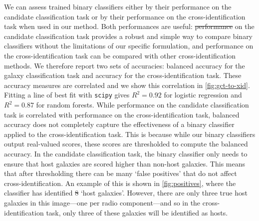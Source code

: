 \documentclass[11pt, a4paper]{book}
\providecommand{\DIFaddtex}[1]{{\protect\color{blue}\uwave{#1}}} %
\providecommand{\DIFdeltex}[1]{{\protect\color{red}\sout{#1}}}                      %
\providecommand{\DIFaddbegin}{} %
\providecommand{\DIFaddend}{} %
\providecommand{\DIFdelbegin}{} %
\providecommand{\DIFdelend}{} %
\providecommand{\DIFadd}[1]{\texorpdfstring{\DIFaddtex{#1}}{#1}} %
\providecommand{\DIFdel}[1]{\texorpdfstring{\DIFdeltex{#1}}{}} %
\newcommand{\DIFscaledelfig}{0.5}
\newlength{\DIFdelgraphicswidth} %
\newlength{\DIFdelgraphicsheight} %
\newcommand{\DIFaddincludegraphics}[2][]{{\color{blue}\fbox{\DIFOincludegraphics[#1]{#2}}}} %
\newcommand{\DIFdelincludegraphics}[2][]{%
\sbox{\DIFdelgraphicsbox}{\DIFOincludegraphics[#1]{#2}}%
\settoboxwidth{\DIFdelgraphicswidth}{\DIFdelgraphicsbox} %
\settoboxtotalheight{\DIFdelgraphicsheight}{\DIFdelgraphicsbox} %
\scalebox{\DIFscaledelfig}{%
\parbox[b]{\DIFdelgraphicswidth}{\usebox{\DIFdelgraphicsbox}\\[-\baselineskip] \rule{\DIFdelgraphicswidth}{0em}}\llap{\resizebox{\DIFdelgraphicswidth}{\DIFdelgraphicsheight}{%
\setlength{\unitlength}{\DIFdelgraphicswidth}%
\begin{picture}(1,1)%
\thicklines\linethickness{2pt} %
{\color[rgb]{1,0,0}\put(0,0){\framebox(1,1){}}}%
{\color[rgb]{1,0,0}\put(0,0){\line( 1,1){1}}}%
{\color[rgb]{1,0,0}\put(0,1){\line(1,-1){1}}}%
\end{picture}%
}\hspace*{3pt}}} %
} %
\DeclareRobustCommand{\DIFaddbegin}{\DIFOaddbegin \let\includegraphics\DIFaddincludegraphics} %
\DeclareRobustCommand{\DIFaddend}{\DIFOaddend \let\includegraphics\DIFOincludegraphics} %
\DeclareRobustCommand{\DIFdelbegin}{\DIFOdelbegin \let\includegraphics\DIFdelincludegraphics} %
\DeclareRobustCommand{\DIFdelend}{\DIFOaddend \let\includegraphics\DIFOincludegraphics} %
\begin{document}
    {We can assess trained binary classifiers either by their performance on
    the candidate classification task or by their performance on the
    cross-identification task when used in our method. Both performances are
    useful: \DIFdelbegin \DIFdel{performance }\DIFdelend \DIFaddbegin \DIFadd{Performance }\DIFaddend on the candidate classification task provides a robust
    and simple way to compare binary classifiers without the limitations of
    our specific formulation, and performance on the cross-identification task
    can be compared with other cross-identification methods. We therefore
    report two sets of accuracies: balanced accuracy for the galaxy
    classification task and accuracy for the cross-identification task. These
    accuracy measures are correlated and we show this correlation in
    \autoref{fig:gct-to-xid}. Fitting a line of best fit with \texttt{scipy}
    gives $R^2 = 0.92$ for logistic regression and $R^2 = 0.87$ for random
    forests. While performance on the candidate classification task is correlated
    with performance on the cross-identification task, balanced accuracy does
    not completely capture the effectiveness of a binary classifier applied to
    the cross-identification task. {This is because while our binary
    classifiers output real-valued scores, these scores are thresholded to
    compute the balanced accuracy}. In the candidate classification
    task, the binary classifier only needs to ensure that host galaxies are
    {scored higher} than non-host galaxies. This means
    {that after thresholding} there can be
    many `false positives' that do not affect cross-identification. An example
    of this is shown in \autoref{fig:positives}, where the classifier has
    identified \DIFdelbegin \DIFdel{8 }\DIFdelend \DIFaddbegin \DIFadd{eight }\DIFaddend `host galaxies'. However, there are only three true host
    galaxies in this image---one per radio component---and so in the
    cross-identification task, only three of these galaxies will be identified
    as hosts.}
\end{document}
